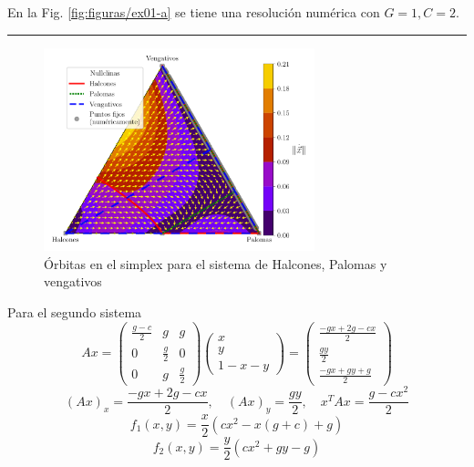 \documentclass[twocolumn,aps,prl]{revtex4-1}
\newcommand*\sepline{%
  \begin{center}
    \rule[1ex]{.5\textwidth}{.5pt}
  \end{center}}
\begin{document}
En la Fig. \ref{fig:figuras/ex01-a} se tiene una resolución numérica con $G=1, C=2$.



\sepline

\begin{figure}[ht!]
    \centering
        \includegraphics[width = 0.7\textwidth]{figuras/ex01-b.pdf}
    \caption{Órbitas en el simplex para el sistema de Halcones, Palomas y vengativos}
    \label{fig:figuras/ex01-b}
\end{figure}

Para el segundo sistema
$$
Ax =
\begin{pmatrix}
    \frac{g-c}{2}&g&g\\ 
    0&\frac{g}{2}&0\\ 
    0&g&\frac{g}{2}
\end{pmatrix}
\begin{pmatrix}
    x\\
    y\\ 
    1-x-y
\end{pmatrix}
=
\begin{pmatrix}
    \frac{-gx+2g-cx}{2}\\ 
    \frac{gy}{2}\\ 
    \frac{-gx+gy+g}{2}
\end{pmatrix}
$$
$$
(Ax)_x = \frac{-gx+2g-cx}{2}
, \quad 
(Ax)_y = \frac{gy}{2}
, \quad 
x^T Ax = \frac{g-cx^2}{2}
$$
$$
f_1(x, y) 
= 
\frac{x}{2} (
    cx^2
    -x(g+c)
    +g
    )
$$
$$
f_2(x, y) 
=
\frac{y}{2} (cx^2+gy-g)
$$
\end{document}
